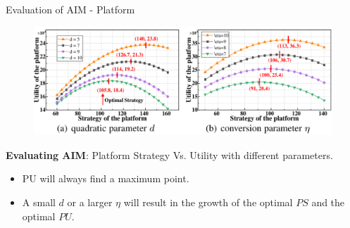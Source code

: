 \documentclass[aspectratio=169,xcolor=dvipsnames]{beamer}
\begin{document}
\begin{frame}[fragile]{Evaluation of AIM - Platform}
    \footnotesize %

    \begin{figure}
        \centering
        \includegraphics[width=0.8\linewidth]{performence_of_AIM.png}
    \end{figure}
    
    \textbf{Evaluating AIM}: Platform Strategy Vs. Utility with different parameters.
    
    \begin{itemize}
        \item PU will always find a maximum point.
        \item A small \(d\) or a larger \(\eta\) will result in the growth of the optimal \(PS\) and the optimal \(PU\).
    \end{itemize}
\end{frame}
\end{document}
